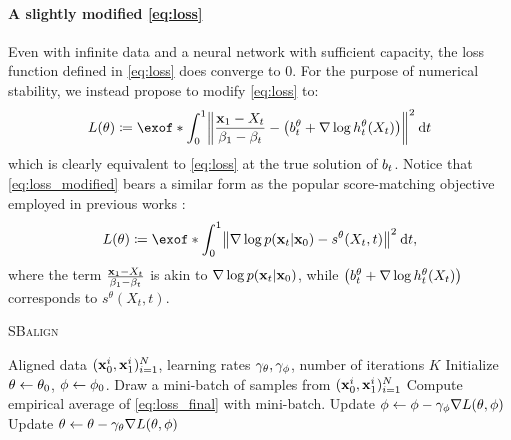\paragraph{A slightly modified \eqref{eq:loss}}
Even with infinite data and a neural network with sufficient capacity, the loss function defined in \eqref{eq:loss} does converge to 0. For the purpose of numerical stability, we instead propose to modify \eqref{eq:loss} to:
\begin{equation}
\label{eq:loss_modified}
\Loss(\theta) \defeq \exof*{\int_0^1 \norm*{\frac{\x_1-X_t}{\cvolat[\horizon]-\cvolat[\ctime]}- \left(\fdrift^\theta + \nabla \log \doob^\theta(X_t)\right)}^2 \dt  }
\end{equation}which is clearly equivalent to \eqref{eq:loss} at the true solution of $\fdrift$. Notice that \eqref{eq:loss_modified} bears a similar form as the popular score-matching objective employed in previous works \citep{song2019generative,song2020score}:
\begin{equation}
\label{eq:score_matching}
\Loss(\theta) \defeq \exof*{\int_0^1 \norm*{\nabla \log p(\x_t | \x_0)- s^\theta(X_t, t)}^2 \dt  },
\end{equation}
where the term $\frac{\x_1-X_t}{\cvolat[\horizon]-\cvolat[\ctime]}$ is akin to $\nabla \log p(\x_t | \x_0)$, while $\left(\fdrift^\theta + \nabla \log \doob^\theta(X_t)\right)$ corresponds to $s^\theta(X_t, t)$. 

 \begin{algorithm}[t]
   \caption{\textsc{SBalign}}
   \label{alg:SBalign}
\begin{algorithmic}
    Aligned data $(\x^i_0,\x^i_1)_{i=1}^N$, learning rates $\lrf,\lrb$, number of iterations $K$ %
\smallskip
   \STATE Initialize $\paramf \subs \paramf_0$, $\paramb \subs \paramb_0$.
   \STATE Draw a mini-batch of samples from $(\x^i_0,\x^i_1)_{i=1}^N$
   \STATE Compute empirical average of \eqref{eq:loss_final} with mini-batch.
   \STATE Update $\paramb \subs \paramb - \lrb\nabla \Loss(\theta,\phi)$
   \STATE Update $\paramf \subs \paramf - \lrf\nabla \Loss(\theta,\phi)$
   \ENDFOR
\end{algorithmic}
\end{algorithm}


